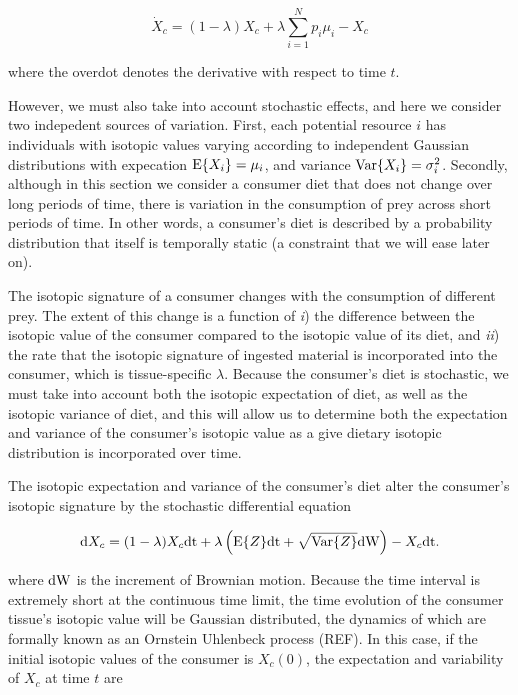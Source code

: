 \documentclass[11pt]{article}
\begin{document}
\begin{equation}
\label{eqODE}
\dot X_c = (1-\lambda)X_c + \lambda \sum_{i=1}^N p_i \mu_i - X_c
\end{equation}

\noindent where the overdot denotes the derivative with respect to time $t$.

However, we must also take into account stochastic effects, and here we consider two indepedent sources of variation.
First, each potential resource $i$ has individuals with isotopic values varying according to independent Gaussian distributions with expecation ${\rm E}\{X_i\}=\mu_i$, and variance ${\rm Var}\{X_i\}=\sigma^2_i$.
Secondly, although in this section we consider a consumer diet that does not change over long periods of time, there is variation in the consumption of prey across short periods of time.
In other words, a consumer's diet is described by a probability distribution that itself is temporally static (a constraint that we will ease later on).

The isotopic signature of a consumer changes with the consumption of different prey.
The extent of this change is a function of
\emph{i}) the difference between the isotopic value of the consumer compared to the isotopic value of its diet, and
\emph{ii}) the rate that the isotopic signature of ingested material is incorporated into the consumer, which is tissue-specific $\lambda$.
Because the consumer's diet is stochastic, we must take into account both the isotopic expectation of diet, as well as the isotopic variance of diet, and this will allow us to determine both the expectation and variance of the consumer's isotopic value as a give dietary isotopic distribution is incorporated over time.

The isotopic expectation and variance of the consumer's diet alter the consumer's isotopic signature by the stochastic differential equation

\begin{equation}
\label{eqSDE}
{\rm d}X_c = (1-\lambda)X_c{\rm dt} + \lambda\left({\rm E}\{Z\}{\rm dt} + \sqrt{{\rm Var}\{Z\}}{\rm dW}\right) - X_c{\rm dt}.
\end{equation}

\noindent where ${\rm dW}$ is the increment of Brownian motion.
Because the time interval is extremely short at the continuous time limit, the time evolution of the consumer tissue's isotopic value will be Gaussian distributed, the dynamics of which are formally known as an Ornstein Uhlenbeck process (REF).
In this case, if the initial isotopic values of the consumer is $X_c(0)$, the expectation and variability of $X_c$ at time $t$ are
\end{document}
